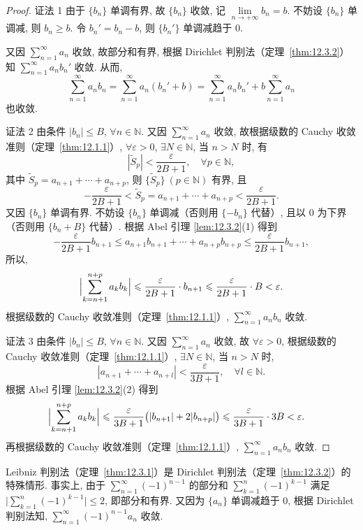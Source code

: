 \begin{proof}
证法 1 由于 $\{b_{n}\}$ 单调有界, 故 $\{b_{n}\}$ 收敛, 记 $\lim\limits_{n\to+\infty}b_{n}=b$. 不妨设 $\{b_{n}\}$ 单调减, 则 $b_{n}\geqslant b$. 令 $b_{n}'=b_{n}-b$, 则 $\{b_{n}'\}$ 单调减趋于 $0$.

又因 $\sum_{n=1}^{\infty}a_{n}$ 收敛, 故部分和有界, 根据 Dirichlet 判别法（定理~\ref{thm:12.3.2}）知 $\sum_{n=1}^{\infty}a_{n}b_{n}'$ 收敛. 从而,
\[
  \sum_{n=1}^{\infty}a_{n}b_{n}
  =\sum_{n=1}^{\infty}a_{n}(b_{n}'+b)
  =\sum_{n=1}^{\infty}a_{n}b_{n}'+b\sum_{n=1}^{\infty}a_{n}
\]
也收敛.

证法 2 由条件 $|b_{n}|\leqslant B$, $\forall n\in\mathbb{N}$. 又因 $\sum_{n=1}^{\infty}a_{n}$ 收敛, 故根据级数的 Cauchy 收敛准则（定理~\ref{thm:12.1.1}）, $\forall\varepsilon>0$, $\exists N\in\mathbb{N}$, 当 $n>N$ 时, 有
\[
  |\widetilde{S}_{p}|<\frac{\varepsilon}{2B+1},\quad\forall p\in\mathbb{N},
\]
其中 $\widetilde{S}_{p}=a_{n+1}+\cdots+a_{n+p}$, 则 $\{\widetilde{S}_{p}\}\ (p\in\mathbb{N})$ 有界, 且
\[
  -\frac{\varepsilon}{2B+1}<\widetilde{S}_{p}=a_{n+1}+\cdots+a_{n+p}<\frac{\varepsilon}{2B+1}.
\]
又因 $\{b_{n}\}$ 单调有界. 不妨设 $\{b_{n}\}$ 单调减（否则用 $\{-b_{n}\}$ 代替）, 且以 $0$ 为下界（否则用 $\{b_{n}+B\}$ 代替）. 根据 Abel 引理 \ref{lem:12.3.2}(1) 得到
\[
  -\frac{\varepsilon}{2B+1}b_{n+1}\leqslant a_{n+1}b_{n+1}+\cdots+a_{n+p}b_{n+p}
  \leqslant\frac{\varepsilon}{2B+1}b_{n+1},
\]
所以,
\[
  \Bigl|\sum_{k=n+1}^{n+p}a_{k}b_{k}\Bigr|
  \leqslant\frac{\varepsilon}{2B+1}\cdot b_{n+1}
  \leqslant\frac{\varepsilon}{2B+1}\cdot B<\varepsilon.
\]
根据级数的 Cauchy 收敛准则（定理~\ref{thm:12.1.1}）, $\sum_{n=1}^{\infty}a_{n}b_{n}$ 收敛.

证法 3 由条件 $|b_{n}|\leqslant B$, $\forall n\in\mathbb{N}$. 又因 $\sum_{n=1}^{\infty}a_{n}$ 收敛, 故 $\forall\varepsilon>0$, 根据级数的 Cauchy 收敛准则（定理~\ref{thm:12.1.1}）, $\exists N\in\mathbb{N}$, 当 $n>N$ 时,
\[
  |a_{n+1}+\cdots+a_{n+l}|<\frac{\varepsilon}{3B+1},\quad\forall l\in\mathbb{N}.
\]
根据 Abel 引理 \ref{lem:12.3.2}(2) 得到
\[
\begin{aligned}
  \Bigl|\sum_{k=n+1}^{n+p}a_{k}b_{k}\Bigr|
  &\leqslant\frac{\varepsilon}{3B+1}\bigl(|b_{n+1}|+2|b_{n+p}|\bigr)
   \leqslant\frac{\varepsilon}{3B+1}\cdot 3B<\varepsilon.
\end{aligned}
\]
再根据级数的 Cauchy 收敛准则（定理~\ref{thm:12.1.1}）, $\sum_{n=1}^{\infty}a_{n}b_{n}$ 收敛.
\end{proof}

\begin{remark}\label{rem:12.3.1}
Leibniz 判别法（定理~\ref{thm:12.3.1}）是 Dirichlet 判别法（定理~\ref{thm:12.3.2}）的特殊情形. 事实上, 由于 $\sum_{n=1}^{\infty}(-1)^{n-1}$ 的部分和 $\sum_{k=1}^{n}(-1)^{k-1}$ 满足 $\bigl|\sum_{k=1}^{n}(-1)^{k-1}\bigr|\leqslant2$, 即部分和有界. 又因为 $\{a_{n}\}$ 单调减趋于 $0$, 根据 Dirichlet 判别法知, $\sum_{n=1}^{\infty}(-1)^{n-1}a_{n}$ 收敛.
\end{remark}


